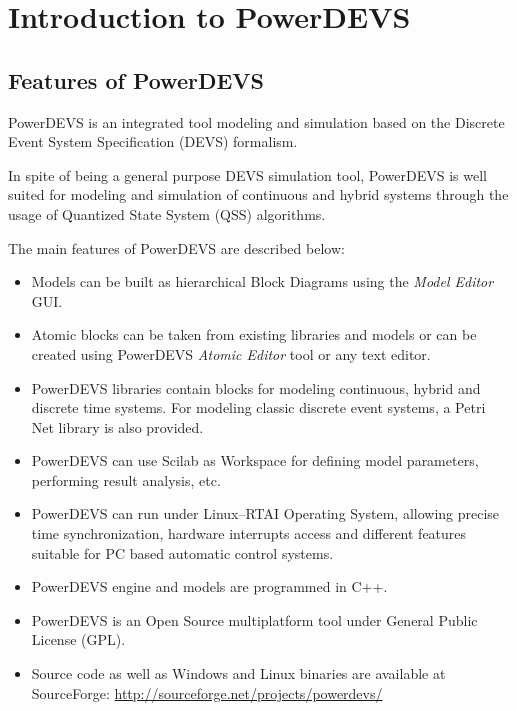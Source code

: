 \chapter{Introduction to PowerDEVS}

\section{Features of PowerDEVS}
PowerDEVS is an integrated tool modeling and simulation based on the Discrete Event System Specification (DEVS) formalism. 

In spite of being a general purpose DEVS simulation tool, PowerDEVS is well suited for modeling and simulation of continuous and hybrid systems through the usage of Quantized State System (QSS) algorithms.

The main features of PowerDEVS are described below:

\begin{itemize}
 \item Models can be built as hierarchical Block Diagrams using the \emph{Model Editor} GUI. 
 \item Atomic blocks can be taken from existing libraries and models or can be created using PowerDEVS \emph{Atomic Editor} tool or any text editor.
 \item PowerDEVS libraries contain blocks for modeling continuous, hybrid and discrete time systems. For modeling classic discrete event systems, a Petri Net library is also provided. 
 \item PowerDEVS can use Scilab as Workspace for defining model parameters, performing result analysis, etc.
 \item PowerDEVS can run under Linux--RTAI Operating System, allowing precise time synchronization, hardware interrupts access and different features suitable for PC based automatic control systems.
 \item PowerDEVS engine and models are programmed in C++.  
 \item PowerDEVS is an Open Source multiplatform tool under General Public License (GPL). 
 \item Source code as well as Windows and Linux binaries are available at SourceForge: \url{http://sourceforge.net/projects/powerdevs/}  
\end{itemize}



